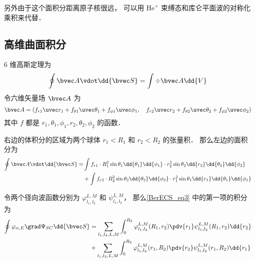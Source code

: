 另外由于这个面积分距离原子核很远， 可以用 $\mathrm{He}^+$ 束缚态和库仑平面波的对称化乘积来代替．

\subsection{高维曲面积分}
6 维高斯定理为
\begin{equation}
\oint \bvec A\vdot \dd{\bvec S} = \int \div \bvec A \dd{V}
\end{equation}
令六维矢量场 $\bvec A$ 为
\begin{equation}
\bvec A = (f_{r1} \uvec r_1 + f_{\theta1}\uvec \theta_1 + f_{\phi1}\uvec \phi_1, \quad f_{r2} \uvec r_2 + f_{\theta2}\uvec \theta_2 + f_{\phi2}\uvec \phi_2)
\end{equation}
其中 $f$ 都是 $r_1,\theta_1,\phi_1,r_2,\theta_2,\phi_2$ 的函数．

右边的体积分的区域为两个球体 $r_1<R_1$ 和 $r_2<R_2$ 的张量积． 那么左边的面积分为
\begin{equation}
\begin{aligned}
\oint \bvec A\vdot \dd{\bvec S} =&\int f_{r1}\cdot  R_1^2\sin\theta_1\dd{\theta_1}\dd{\phi_1}\cdot r_2^2\sin\theta_2 \dd{r_2}\dd{\theta_2}\dd{\phi_2}\\
&+\int f_{r2}\cdot  R_2^2\sin\theta_2\dd{\theta_2}\dd{\phi_2}\cdot r_1^2\sin\theta_1 \dd{r_1}\dd{\theta_1}\dd{\phi_1}
\end{aligned}
\end{equation}

令两个径向波函数分别为 $\varphi_{l_1,l_2}^{L,M}$ 和 $\psi_{l_1,l_2}^{L,M}$， 那么\autoref{BerECS_eq3} 中的第一项的积分为
\begin{equation}
\begin{aligned}
\oint \varphi_{\alpha,E} \grad \Psi_{SC} \dd{\bvec S} &= \sum_{l_1,l_2,L,M}\int_0^{R_2} \varphi_{l_1,l_2}^{L,M}(R_1,r_2) \pdv{r_1} \psi_{l_1,l_2}^{L,M}(R_1,r_2)\dd{r_2}\\
&+\sum_{l_1,l_2,L,M}\int_0^{R_2} \varphi_{l_1,l_2}^{L,M}(r_1,R_2) \pdv{r_2} \psi_{l_1,l_2}^{L,M}(r_1,R_2)\dd{r_1}
\end{aligned}
\end{equation}

